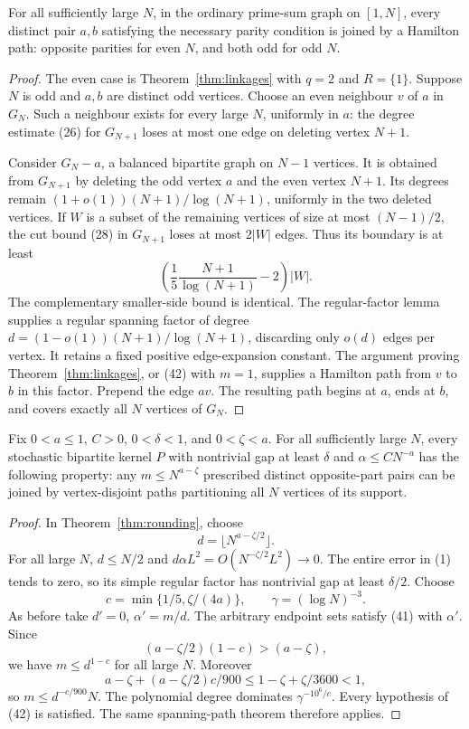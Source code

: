 \begin{corollary}
\label{cor:oddendpoints}
For all sufficiently large \(N\), in the ordinary prime-sum
graph on \([1,N]\), every distinct pair \(a,b\) satisfying
the necessary parity condition is joined by a Hamilton path:
opposite parities for even \(N\), and both odd for odd \(N\).
\end{corollary}
\begin{proof}
The even case is Theorem~\ref{thm:linkages} with \(q=2\)
and \(R=\{1\}\).
Suppose \(N\) is odd and \(a,b\) are distinct odd vertices.
Choose an even neighbour \(v\) of \(a\) in \(G_N\).
Such a neighbour exists for every large \(N\), uniformly in
\(a\): the degree estimate (26) for \(G_{N+1}\) loses at
most one edge on deleting vertex \(N+1\).

Consider \(G_N-a\), a balanced bipartite graph on \(N-1\)
vertices. It is obtained from \(G_{N+1}\) by deleting the
odd vertex \(a\) and the even vertex \(N+1\).
Its degrees remain \((1+o(1))(N+1)/\log(N+1)\),
uniformly in the two deleted vertices.
If \(W\) is a subset of the remaining vertices of size at
most \((N-1)/2\), the cut bound (28) in \(G_{N+1}\) loses
at most \(2|W|\) edges. Thus its boundary is at least
\[
 \left(\frac15\frac{N+1}{\log(N+1)}-2\right)|W|.
\]
The complementary smaller-side bound is identical.
The regular-factor lemma supplies a regular spanning factor
of degree \(d=(1-o(1))(N+1)/\log(N+1)\), discarding only
\(o(d)\) edges per vertex.
It retains a fixed positive edge-expansion constant.
The argument proving Theorem~\ref{thm:linkages}, or (42)
with \(m=1\), supplies a Hamilton path from \(v\) to \(b\)
in this factor. Prepend the edge \(av\).
The resulting path begins at \(a\), ends at \(b\), and
covers exactly all \(N\) vertices of \(G_N\).
\end{proof}

\begin{corollary}
\label{cor:weightedlinkages}
Fix \(0<a\leq1\), \(C>0\), \(0<\delta<1\), and
\(0<\zeta<a\).
For all sufficiently large \(N\), every stochastic bipartite
kernel \(P\) with nontrivial gap at least \(\delta\) and
\(\alpha\leq C N^{-a}\) has the following property:
any \(m\leq N^{a-\zeta}\) prescribed distinct opposite-part
pairs can be joined by vertex-disjoint paths partitioning
all \(N\) vertices of its support.
\end{corollary}
\begin{proof}
In Theorem~\ref{thm:rounding}, choose
\[
 d=\lfloor N^{a-\zeta/2}\rfloor.
\]
For all large \(N\), \(d\leq N/2\) and
\(d\alpha L^2=O(N^{-\zeta/2}L^2)\to0\).
The entire error in (1) tends to zero, so its simple regular
factor has nontrivial gap at least \(\delta/2\).
Choose
\[
 c=\min\{1/5,\zeta/(4a)\},\qquad\gamma=(\log N)^{-3}.
\]
As before take \(d'=0\), \(\alpha'=m/d\).
The arbitrary endpoint sets satisfy (41) with \(\alpha'\).
Since
\[
 (a-\zeta/2)(1-c)>(a-\zeta),
\]
we have \(m\leq d^{1-c}\) for all large \(N\).
Moreover
\[
 a-\zeta+(a-\zeta/2)c/900
 \leq 1-\zeta+\zeta/3600<1,
\]
so \(m\leq d^{-c/900}N\).
The polynomial degree dominates
\(\gamma^{-10^6/c}\).
Every hypothesis of (42) is satisfied.
The same spanning-path theorem therefore applies.
\end{proof}
